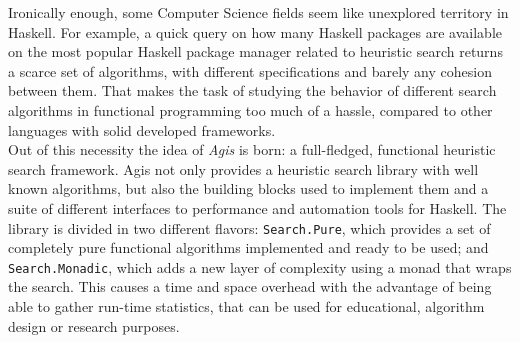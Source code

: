 Ironically enough, some Computer Science fields seem like unexplored territory
in Haskell. For example, a quick query on how many Haskell packages are
available on the most popular Haskell package manager related to heuristic
search returns a scarce set of algorithms, with different specifications and
barely any cohesion between them. That makes the task of studying the behavior
of different search algorithms in functional programming too much of a hassle,
compared to other languages with solid developed frameworks.\\

Out of this necessity the idea of \emph{Agis} is born: a full-fledged,
functional heuristic search framework. Agis not only provides a heuristic
search library with well known algorithms, but also the building blocks used to
implement them and a suite of different interfaces to performance and
automation tools for Haskell. The library is divided in two different flavors:
\texttt{Search.Pure}, which provides a set of completely pure functional
algorithms implemented and ready to be used; and \texttt{Search.Monadic}, which
adds a new layer of complexity using a monad that wraps the search. This causes
a time and space overhead with the advantage of being able to gather run-time
statistics, that can be used for educational, algorithm design or research
purposes. 

\newpage

